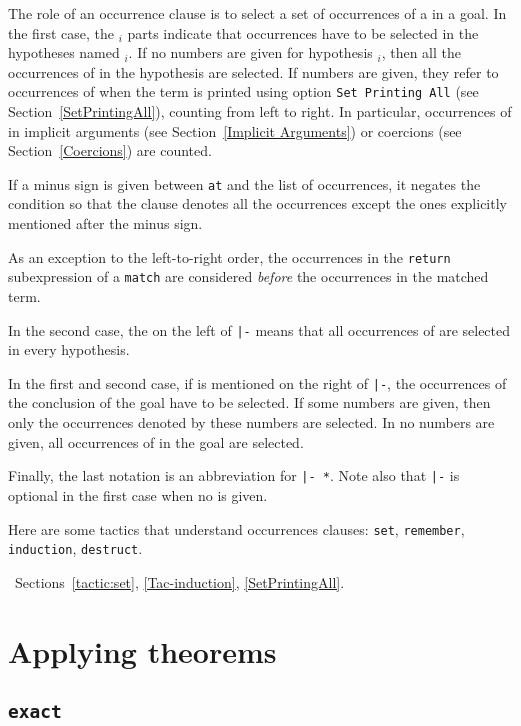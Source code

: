 The role of an occurrence clause is to select a set of occurrences of
a {\term} in a goal. In the first case, the {{\ident$_i$}
} parts
indicate that occurrences have to be selected in the hypotheses named
{\ident$_i$}.  If no numbers are given for hypothesis {\ident$_i$},
then all the occurrences of {\term} in the hypothesis are selected. If
numbers are given, they refer to occurrences of {\term} when the term
is printed using option {\tt Set Printing All} (see
Section~\ref{SetPrintingAll}), counting from left to right. In
particular, occurrences of {\term} in implicit arguments (see
Section~\ref{Implicit Arguments}) or coercions (see
Section~\ref{Coercions}) are counted.

If a minus sign is given between {\tt at} and the list of occurrences,
it negates the condition so that the clause denotes all the occurrences except
the ones explicitly mentioned after the minus sign.

As an exception to the left-to-right order, the occurrences in the
{\tt return} subexpression of a {\tt match} are considered {\em
before} the occurrences in the matched term.

In the second case, the {\tt *} on the left of {\tt |-} means that
all occurrences of {\term} are selected in every hypothesis.

In the first and second case, if {\tt *} is mentioned on the right of
{\tt |-}, the occurrences of the conclusion of the goal have to be
selected. If some numbers are given, then only the occurrences denoted
by these numbers are selected. In no numbers are given, all
occurrences of {\term} in the goal are selected.

Finally, the last notation is an abbreviation for {\tt * |- *}. Note
also that {\tt |-} is optional in the first case when no {\tt *} is
given.

Here are some tactics that understand occurrences clauses:
{\tt set}, {\tt remember}, {\tt induction}, {\tt destruct}.

\SeeAlso~Sections~\ref{tactic:set}, \ref{Tac-induction}, \ref{SetPrintingAll}.

\section{Applying theorems}

\subsection{\tt exact \term}
\label{exact}

